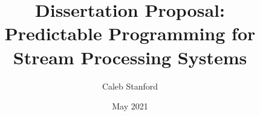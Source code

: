 \documentclass{article}
\title{\Large{} Dissertation Proposal: \\ Predictable Programming for Stream Processing Systems}
\author{Caleb Stanford}
\date{May 2021}
\begin{document}
\maketitle{}



\tableofcontents{}











\renewcommand{\refname}{Other References}


\end{document}
